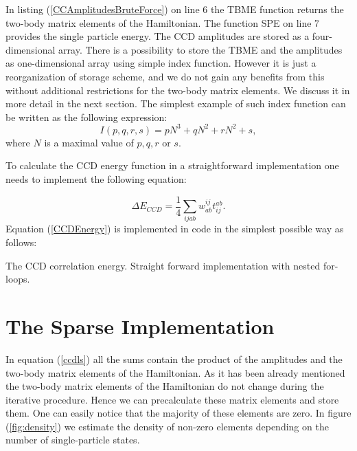\documentclass[twoside,english]{uiofysmaster}
\begin{document}
In listing (\ref{CCAmplitudesBruteForce}) on line 6 the TBME function
returns the two-body matrix elements of the Hamiltonian. The function SPE
on line 7 provides the single particle energy. The CCD amplitudes are
stored as a four-dimensional array.  There is a possibility to store
the TBME and the amplitudes as one-dimensional array using simple
index function. However it is just a reorganization of storage scheme,
and we do not gain any benefits from this without additional
restrictions for the two-body matrix elements. We discuss it in more
detail in the next section. The simplest example of such index
function can be written as the following expression:
\begin{equation}\label{simplemapping}
I(p,q,r,s) = pN^3+ qN^2+ rN^2+ s,
\end{equation}  
where $N$ is a maximal value of $p,q,r$ or $s$.

To calculate the CCD energy function in a straightforward implementation one needs to implement the following equation:

\begin{equation}\label{CCDEnergy}
\Delta E_{CCD} = \frac{1}{4} \sum_{ijab} w_{ab}^{ij} t_{ij}^{ab}.
\end{equation}
Equation (\ref{CCDEnergy}) is implemented in code in the simplest possible way as follows:
\IncMargin{1em}
\begin{algorithm}[H]
	\SetAlgoLined
	
	\BlankLine
	
	\For{$i\leftarrow 1$ \KwTo $N_{\mathrm{Fermi}}$}{
		\For{$j\leftarrow 1$ \KwTo $N_{\mathrm{Fermi}}$}{  %
			\For{$a\leftarrow N_{\mathrm{Fermi}}$ \KwTo $N_{\mathrm{States}}$}{
				\For{$b\leftarrow N_{\mathrm{Fermi}}$ \KwTo $N_{\mathrm{states}}$}{
					CCD Correlation Energy += TBME($i,j,a,b$)*Amplitudes($a,b,i,j$)
				}
			}
		}
	}
	\caption{The CCD correlation energy. Straight forward implementation with nested for-loops.}\label{CCDeltaEBruteForce}
\end{algorithm}\DecMargin{1em}



\section{The Sparse Implementation}
In equation (\ref{ccdls}) all the sums contain the product of the
amplitudes and the two-body matrix elements of the Hamiltonian. As it
has been already mentioned the two-body matrix elements of the
Hamiltonian do not change during the iterative procedure. Hence we can
precalculate these matrix elements and store them. One can easily
notice that the majority of these elements are zero. In figure
(\ref{fig:density}) we estimate the density of non-zero elements depending
on the number of single-particle states.
\end{document}
